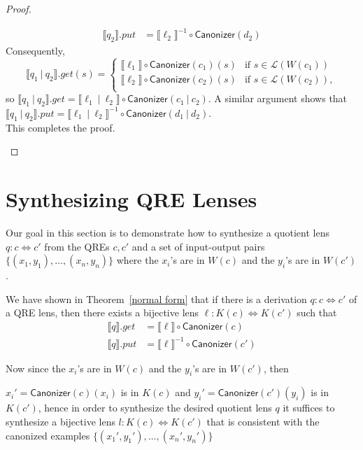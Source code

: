 \documentclass{svproc}
\newcommand{\kw}[1]{\ensuremath{\mathsf{#1}}}
\newcommand{\sep}{\ensuremath{\ | \ }}
\newcommand{\canonizer}{\ensuremath{\kw{Canonizer}}}
\begin{document}
\begin{proof}
\begin{enumerate}
\begin{align*}
\llbracket q_2 \rrbracket.put &= {\llbracket \ell_2 \rrbracket}^{-1} \circ
\canonizer(d_2)
\end{align*}
Consequently,
$$
  \llbracket q_1 \sep q_2 \rrbracket.get(s) = 
  \begin{cases}
  \llbracket \ell_1 \rrbracket \circ
\canonizer(c_1) (s) & \text{if } s \in \mathcal{L}(W(c_1))\\
  \llbracket \ell_2 \rrbracket \circ
\canonizer(c_2) (s) & \text{if } s \in \mathcal{L}(W(c_2)),\\
  \end{cases}$$
  so $\llbracket q_1 \sep q_2 \rrbracket.get = \llbracket \ell_1 \sep
  \ell_2 \rrbracket \circ \canonizer(c_1 \sep c_2)$. A similar argument shows
  that $\llbracket q_1 \sep q_2 \rrbracket.put = \llbracket \ell_1 \sep
  \ell_2 \rrbracket^{-1} \circ \canonizer(d_1 \sep d_2)$.\\
  This completes the proof.
\end{enumerate}
\end{proof}

\fi
\section{Synthesizing QRE Lenses}
\label{synth}
Our goal in this section is to demonstrate how to synthesize a quotient lens
$q: c \Leftrightarrow c'$ from the QREs $c, c'$ and a set of input-output pairs
$\{(x_1, y_1), \ldots, (x_n, y_n)\}$ where the $x_i$'s are in $W(c)$ and the
$y_i$'s are in $W(c')$.

We have shown in Theorem~\ref{normal form} that if there is a derivation $q : c
\Leftrightarrow c'$ of a QRE lens, then there exists a bijective lens $\ell :
K(c) \Leftrightarrow K(c')$ such that
\begin{align*}
\llbracket q \rrbracket.get &= \llbracket \ell \rrbracket\circ \canonizer(c)\\
\llbracket q \rrbracket.put &= \llbracket \ell \rrbracket^{-1} \circ
\canonizer(c')
\end{align*}

Now since the $x_i$'s are in $W(c)$ and the $y_i$'s are in $W(c')$, then

\noindent ${x_i}' = \canonizer(c)(x_i)$ is in $K(c)$ and ${y_i}' =
\canonizer(c')(y_i)$ is in $K(c')$, hence in order to synthesize the desired
quotient lens $q$ it suffices to synthesize a bijective lens $l : K(c)
\Leftrightarrow K(c')$ that is consistent with the canonized examples
$\{({x_1}', {y_1}'), \ldots, ({x_n}', {y_n}')\}$
\end{document}

